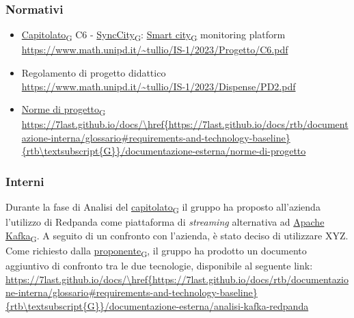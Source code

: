 \subsubsection{Normativi}
\begin{itemize}
	\item \href{https://7last.github.io/docs/rtb/documentazione-interna/glossario\#capitolato}{Capitolato\textsubscript{G}} C6 - \href{https://7last.github.io/docs/rtb/documentazione-interna/glossario\#synccity}{SyncCity\textsubscript{G}}: \href{https://7last.github.io/docs/rtb/documentazione-interna/glossario\#smart-city}{Smart city\textsubscript{G}} monitoring platform\\
	      \url{https://www.math.unipd.it/~tullio/IS-1/2023/Progetto/C6.pdf}
	\item Regolamento di progetto didattico\\
	      \url{https://www.math.unipd.it/~tullio/IS-1/2023/Dispense/PD2.pdf}
	\item \href{https://7last.github.io/docs/rtb/documentazione-interna/glossario\#norme-di-progetto}{Norme di progetto\textsubscript{G}}\\
	      \url{https://7last.github.io/docs/\href{https://7last.github.io/docs/rtb/documentazione-interna/glossario\#requirements-and-technology-baseline}{rtb\textsubscript{G}}/documentazione-esterna/norme-di-progetto}
\end{itemize}

\subsubsection{Interni}
Durante la fase di Analisi del \href{https://7last.github.io/docs/rtb/documentazione-interna/glossario\#capitolato}{capitolato\textsubscript{G}} il gruppo ha proposto all'azienda
l'utilizzo di Redpanda come piattaforma di \textit{streaming} alternativa ad \href{https://7last.github.io/docs/rtb/documentazione-interna/glossario\#apache-kafka}{Apache Kafka\textsubscript{G}}.
A seguito di un confronto con l'azienda, è stato deciso di utilizzare XYZ.\\
Come richiesto dalla \href{https://7last.github.io/docs/rtb/documentazione-interna/glossario\#proponente}{proponente\textsubscript{G}}, il gruppo ha prodotto un documento aggiuntivo di
confronto tra le due tecnologie, disponibile al seguente link:\\
\url{https://7last.github.io/docs/\href{https://7last.github.io/docs/rtb/documentazione-interna/glossario\#requirements-and-technology-baseline}{rtb\textsubscript{G}}/documentazione-esterna/analisi-kafka-redpanda}
